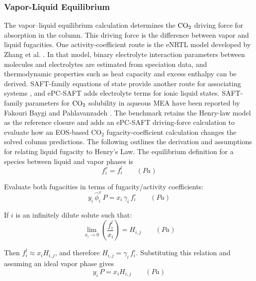             \subsubsection{Vapor-Liquid Equilibrium}
                The vapor--liquid equilibrium calculation determines the $\COtwo$ driving force for absorption in the column. This driving force is the difference between vapor and liquid fugacities. One activity-coefficient route is the eNRTL model developed by Zhang et al. \cite{Zhang2011}. In that model, binary electrolyte interaction parameters between molecules and electrolytes are estimated from speciation data, and thermodynamic properties such as heat capacity and excess enthalpy can be derived. SAFT-family equations of state provide another route for associating systems \cite{Gross2001,Cameretti2005}, and ePC-SAFT adds electrolyte terms for ionic liquid states. SAFT-family parameters for $\COtwo$ solubility in aqueous MEA have been reported by Fakouri Baygi and Pahlavanzadeh \cite{Baygi2015}. The benchmark retains the Henry-law model as the reference closure and adds an ePC-SAFT driving-force calculation to evaluate how an EOS-based CO$_2$ fugacity-coefficient calculation changes the solved column predictions. The following outlines the derivation and assumptions for relating liquid fugacity to Henry's Law. The equilibrium definition for a species between liquid and vapor phases is
                \begin{equation}
                    f_i^v = f_i^l
                    \qquad \left(\unit{Pa}\right)
                \end{equation}

                Evaluate both fugacities in terms of fugacity/activity coefficients:
                \begin{equation}
                    y_i \, \hat{\phi}_i^v \, P = x_i \, \gamma_i \, f_i^\circ
                    \qquad \left(\unit{Pa}\right)
                \end{equation}

                If $i$ is an infinitely dilute solute such that:
                \begin{equation}
                    \lim_{x_i \to 0} \left( \frac{f_i^l}{x_i} \right) = H_{i,j}
                    \qquad \left(\unit{Pa}\right)
                \end{equation}

                Then $f_i^l \approx x_i H_{i,j}$, and therefore $H_{i,j} = \gamma_i \, f_i^\circ$. Substituting this relation and assuming an ideal vapor phase gives
                \begin{equation}
                    y_i\, P = x_i H_{i,j}
                    \qquad \left(\unit{Pa}\right)
                \end{equation}

